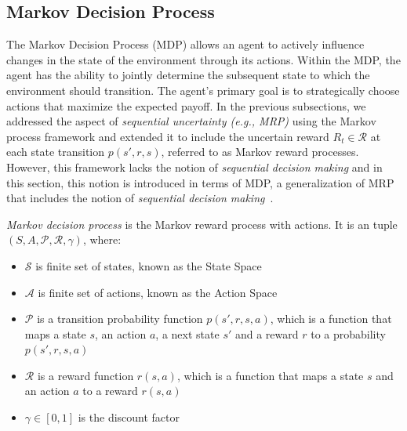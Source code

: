 \documentclass[../xlapes02]{subfiles}
\begin{document}
    \subsection{Markov Decision Process}\label{subsec:markov-decision-process}
    The Markov Decision Process (MDP) allows an agent to actively influence changes in the state of the environment through its actions. Within the MDP, the agent has the ability to jointly determine the subsequent state to which the environment should transition. The agent's primary goal is to strategically choose actions that maximize the expected payoff. In the previous subsections, we addressed the aspect of \emph{sequential uncertainty (e.g., MRP)} using the Markov process framework and extended it to include the uncertain reward $R_t\in\mathcal{R}$ at each state transition $p(s',r,s)$, referred to as Markov reward processes. However, this framework lacks the notion of \emph{sequential decision making} and in this section, this notion is introduced in terms of MDP, a generalization of MRP that includes the notion of \emph{sequential decision making}~\cite{rao2022foundations}.
%
    \begin{definition}
        \emph{Markov decision process} is the Markov reward process with actions. It is an tuple $(S,A,\mathcal{P},\mathcal{R},\gamma)$, where:
        \begin{itemize}
            \item $\mathcal{S}$ is finite set of states, known as the State Space
            \item $\mathcal{A}$ is finite set of actions, known as the Action Space
            \item $\mathcal{P}$ is a transition probability function $p(s',r,s,a)$, which is a function that maps a state $s$, an action $a$, a next state $s'$ and a reward $r$ to a probability $p(s',r,s,a)$
            \item $\mathcal{R}$ is a reward function $r(s,a)$, which is a function that maps a state $s$ and an action $a$ to a reward $r(s,a)$
            \item $\gamma\in[0,1]$ is the discount factor
        \end{itemize}
    \end{definition}
\end{document}
